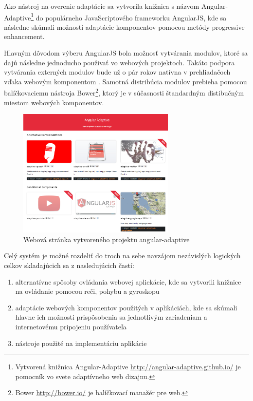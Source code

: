 Ako nástroj na overenie adaptácie sa vytvorila knižnica s názvom Angular-Adaptive\footnote{Vytvorená knižnica Angular-Adaptive \url{http://angular-adaptive.github.io/} je pomocník vo svete adaptívneho web dizajnu.} do populárneho JavaScriptového frameworku AngularJS, kde sa následne skúmali možnosti adaptácie komponentov pomocou metódy progressive enhancement.

Hlavným dôvodom výberu AngularJS bola možnosť vytvárania modulov, ktoré sa dajú následne jednoducho použivať vo webových projektoch. Takáto podpora vytvárania externých modulov bude už o pár rokov natívna v prehliadačoch vďaka webovým komponentom \cite{webcomponents}. Samotná distribúcia modulov prebieha pomocou balíčkovaciemu nástroja Bower\footnote{Bower \url{http://bower.io/} je balíčkovací manažér pre web.}, ktorý je v súčasnosti štandardným distibučným miestom webových komponentov.

\begin{figure}[H]
  \centering
  \includegraphics[width=0.7\textwidth]{img/angularadaptive.png}
  \caption[Webová stránka vytvoreného projektu angular-adaptive]{
    Webová stránka vytvoreného projektu angular-adaptive}
  \label{fig: angularadaptive}
\end{figure}

\newpage
Celý systém je možné rozdeliť do troch na sebe navzájom nezávislých logických celkov skladajúcich sa z nasledujúcich častí:

\begin{enumerate}
  \item alternatívne spôsoby ovládania webovej apliekácie, kde sa vytvorili knižnice na ovládanie pomocou reči, pohybu a gyroskopu
  \item adaptácie webových komponentov použitých v aplikáciách, kde sa skúmali hlavne ich možnosti prispôsobenia sa jednotlivým zariadeniam a internetovému pripojeniu používateľa
  \item nástroje použité na implementáciu aplikácie
\end{enumerate}

